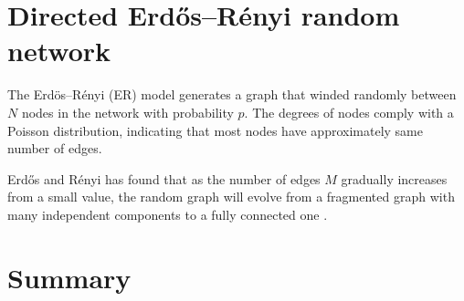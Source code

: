\section{Directed Erdős–Rényi random network}
The Erdös–Rényi (ER) model generates a graph that winded randomly between $N$ nodes in the network with probability $p$. The degrees of nodes comply with a Poisson distribution, indicating that most nodes have approximately same number of edges.

Erdős and Rényi has found that as the number of edges $M$ gradually increases from a small value, the random graph will evolve from a fragmented graph with many independent components to a fully connected one \cite{strogatz2001exploring}.

\section{Summary}
